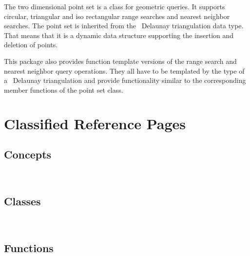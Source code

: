 

\ccParDims





The two dimensional point set is a class for geometric queries.
It supports circular, triangular and iso rectangular range searches and
nearest neighbor searches.
The point set is inherited from the \cgal\ Delaunay triangulation data type.
That means that it is a dynamic data structure supporting the insertion and
deletion of points. 

This package also provides function template versions of the range search and nearest
neighbor query operations. They all have to be templated by the type of a \cgal\
Delaunay triangulation and provide functionality similar to the corresponding
member functions of the point set class.



\section{Classified Reference Pages}

\subsection*{Concepts}
\\

\subsection*{Classes}
\\

\subsection*{Functions}
\\
\\


